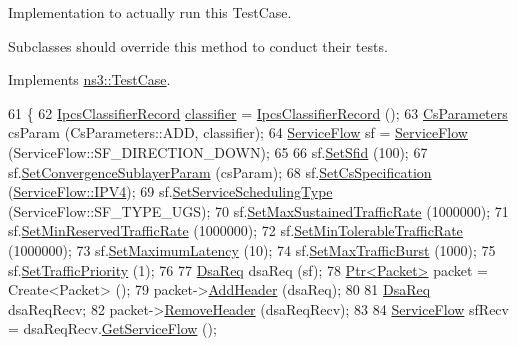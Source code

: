 Implementation to actually run this Test\+Case. 

Subclasses should override this method to conduct their tests. 

Implements \hyperlink{classns3_1_1TestCase_a8ff74680cf017ed42011e4be51917a24}{ns3\+::\+Test\+Case}.


\begin{DoxyCode}
61 \{
62   \hyperlink{classns3_1_1IpcsClassifierRecord}{IpcsClassifierRecord} \hyperlink{design_8txt_af9e6b398b148789960232a87c72a107e}{classifier} = 
      \hyperlink{classns3_1_1IpcsClassifierRecord}{IpcsClassifierRecord} ();
63   \hyperlink{classns3_1_1CsParameters}{CsParameters} csParam (CsParameters::ADD, classifier);
64   \hyperlink{classns3_1_1ServiceFlow}{ServiceFlow} sf = \hyperlink{classns3_1_1ServiceFlow}{ServiceFlow} (ServiceFlow::SF\_DIRECTION\_DOWN);
65 
66   sf.\hyperlink{classns3_1_1ServiceFlow_a1708510e6b5769fd3086097dc657571f}{SetSfid} (100);
67   sf.\hyperlink{classns3_1_1ServiceFlow_a81a801e05aac9e7d1cfad3304e1b9d97}{SetConvergenceSublayerParam} (csParam);
68   sf.\hyperlink{classns3_1_1ServiceFlow_a72779cfbd71284ba06f10843ec0725b9}{SetCsSpecification} (\hyperlink{namespacens3_a79988e6e8b09f64c6ffca894994cb033af56451cc069a62c29e3d7577328b5027}{ServiceFlow::IPV4});
69   sf.\hyperlink{classns3_1_1ServiceFlow_acdef049af2eda0d1ac80047208ce7571}{SetServiceSchedulingType} (ServiceFlow::SF\_TYPE\_UGS);
70   sf.\hyperlink{classns3_1_1ServiceFlow_aef578837096b1a316696a88ecd550e7c}{SetMaxSustainedTrafficRate} (1000000);
71   sf.\hyperlink{classns3_1_1ServiceFlow_ad49e9a793508d2d476de1e08897ecbf6}{SetMinReservedTrafficRate} (1000000);
72   sf.\hyperlink{classns3_1_1ServiceFlow_aafc2368b8dab5d394635fa9f7fe281af}{SetMinTolerableTrafficRate} (1000000);
73   sf.\hyperlink{classns3_1_1ServiceFlow_a61781dc767b833dfc34ed86e9efbc62d}{SetMaximumLatency} (10);
74   sf.\hyperlink{classns3_1_1ServiceFlow_a586065681c386771f441a51f469fab03}{SetMaxTrafficBurst} (1000);
75   sf.\hyperlink{classns3_1_1ServiceFlow_a9fd37b11439e3b6ca601c76e54d6273c}{SetTrafficPriority} (1);
76 
77   \hyperlink{classns3_1_1DsaReq}{DsaReq} dsaReq (sf);
78   \hyperlink{classns3_1_1Ptr}{Ptr<Packet>} packet = Create<Packet> ();
79   packet->\hyperlink{classns3_1_1Packet_a465108c595a0bc592095cbcab1832ed8}{AddHeader} (dsaReq);
80 
81   \hyperlink{classns3_1_1DsaReq}{DsaReq} dsaReqRecv;
82   packet->\hyperlink{classns3_1_1Packet_a0961eccf975d75f902d40956c93ba63e}{RemoveHeader} (dsaReqRecv);
83 
84   \hyperlink{classns3_1_1ServiceFlow}{ServiceFlow} sfRecv = dsaReqRecv.\hyperlink{classns3_1_1DsaReq_aaa23ab24bba50ef22b5d74c58bc12a5d}{GetServiceFlow} ();

\end{DoxyCode}
